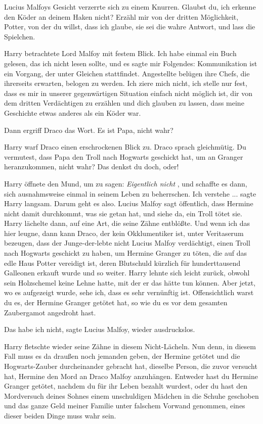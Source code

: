 Lucius Malfoys Gesicht verzerrte sich zu einem Knurren. \glqq{}Glaubst du, ich
erkenne den Köder an deinem Haken nicht? Erzähl mir von der dritten Möglichkeit,
Potter, von der du willst, dass ich glaube, sie sei die wahre Antwort, und lass
die Spielchen.\grqq{}

Harry betrachtete Lord Malfoy mit festem Blick. \glqq{}Ich habe einmal ein Buch
gelesen, das ich nicht lesen sollte, und es sagte mir Folgendes: Kommunikation
ist ein Vorgang, der unter Gleichen stattfindet. Angestellte belügen ihre Chefs,
die ihrerseits erwarten, belogen zu werden. Ich ziere mich nicht, ich stelle nur
fest, dass es mir in unserer gegenwärtigen Situation einfach nicht möglich ist,
dir von dem dritten Verdächtigen zu erzählen und dich glauben zu lassen, dass
meine Geschichte etwas anderes als ein Köder war.\grqq{}

Dann ergriff Draco das Wort. \glqq{}Es ist Papa, nicht wahr?\grqq{}

Harry warf Draco einen erschrockenen Blick zu. Draco sprach gleichmütig. \glqq{}
Du vermutest, dass Papa den Troll nach Hogwarts geschickt hat, um an Granger
heranzukommen, nicht wahr? Das denkst du doch, oder!\grqq{}

Harry öffnete den Mund, um zu sagen:\emph{ \glqq{}Eigentlich nicht\grqq{}} , und
schaffte es dann, sich ausnahmsweise einmal in seinem Leben zu beherrschen.
\glqq{}Ich verstehe ...\grqq{} sagte Harry langsam. \glqq{}Darum geht es also.
Lucius Malfoy sagt öffentlich, dass Hermine nicht damit durchkommt, was sie
getan hat, und siehe da, ein Troll tötet sie.\grqq{} Harry lächelte dann, auf
eine Art, die seine Zähne entblößte. \glqq{}Und wenn ich das hier leugne, dann
kann Draco, der kein Okklumentiker ist, unter Veritaserum bezeugen, dass der
Junge-der-lebte nicht Lucius Malfoy verdächtigt, einen Troll nach Hogwarts
geschickt zu haben, um Hermine Granger zu töten, die auf das edle Haus Potter
vereidigt ist, deren Blutschuld kürzlich für hunderttausend Galleonen erkauft
wurde und so weiter.\grqq{} Harry lehnte sich leicht zurück, obwohl sein
Holzschemel keine Lehne hatte, mit der er das hätte tun können. \glqq{}Aber
jetzt, wo es aufgezeigt wurde, sehe ich, dass es sehr vernünftig ist.
Offensichtlich warst du es, der Hermine Granger getötet hat, so wie du es vor
dem gesamten Zaubergamot angedroht hast.\grqq{}

\glqq{}Das habe ich nicht\grqq{}, sagte Lucius Malfoy, wieder ausdruckslos.

Harry fletschte wieder seine Zähne in diesem Nicht-Lächeln. \glqq{}Nun denn, in
diesem Fall muss es da draußen noch jemanden geben, der Hermine getötet und die
Hogwarts-Zauber durcheinander gebracht hat, dieselbe Person, die zuvor versucht
hat, Hermine den Mord an Draco Malfoy anzuhängen. Entweder hast du Hermine
Granger getötet, nachdem du für ihr Leben bezahlt wurdest, oder du hast den
Mordversuch deines Sohnes einem unschuldigen Mädchen in die Schuhe geschoben und
das ganze Geld meiner Familie unter falschem Vorwand genommen, eines dieser
beiden Dinge muss wahr sein.\grqq{}

